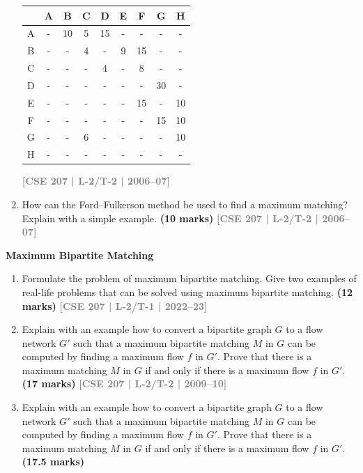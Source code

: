 \documentclass[12pt,a3paper]{article}
\newcommand{\yr}[1]{\hfill\textcolor{gray}{\small\textbf{[#1]}}}
\newcommand{\mk}[1]{\textcolor{orange!70!black}{\small\textbf{(#1 marks)}}}
\newcommand{\subtopic}[2]{%
  \vspace{10pt}
  \noindent\begin{tcolorbox}[colback=#1!8,colframe=#1,boxrule=0.6pt,arc=4pt,
    left=6pt,right=6pt,top=4pt,bottom=4pt]
    \small\bfseries\textcolor{#1}{#2}
  \end{tcolorbox}
  \vspace{2pt}
}
\begin{document}
\begin{enumerate}
\begin{center}
\begin{tabular}{ccccccccc}
\toprule
  & A  & B  & C & D & E  & F  & G  & H \\
\midrule
A & -  & 10 & 5 & 15 & - & -  & -  & - \\
B & -  & -  & 4 & -  & 9 & 15 & -  & - \\
C & -  & -  & - & 4  & - & 8  & -  & - \\
D & -  & -  & - & -  & - & -  & 30 & - \\
E & -  & -  & - & -  & - & 15 & -  & 10 \\
F & -  & -  & - & -  & - & -  & 15 & 10 \\
G & -  & -  & 6 & -  & - & -  & -  & 10 \\
H & -  & -  & - & -  & - & -  & -  & - \\
\bottomrule
\end{tabular}
\end{center}
\yr{CSE 207 | L-2/T-2 | 2006--07}

\item How can the Ford--Fulkerson method be used to find a maximum matching? Explain with a simple example. \mk{10}
\yr{CSE 207 | L-2/T-2 | 2006--07}




\end{enumerate}

\subtopic{cA}{Maximum Bipartite Matching}
\label{sub:s1-bipartite}

\begin{enumerate}

\item Formulate the problem of maximum bipartite matching. Give two examples of real-life problems that can be solved using maximum bipartite matching.
\mk{12} \yr{CSE 207 | L-2/T-1 | 2022--23}


\item Explain with an example how to convert a bipartite graph $G$ to a flow network $G'$ such that a maximum bipartite matching $M$ in $G$ can be computed by finding a maximum flow $f$ in $G'$. Prove that there is a maximum matching $M$ in $G$ if and only if there is a maximum flow $f$ in $G'$. \mk{17}
\yr{CSE 207 | L-2/T-2 | 2009--10}

\item Explain with an example how to convert a bipartite graph $G$ to a flow network
$G'$ such that a maximum bipartite matching $M$ in $G$ can be computed by finding
a maximum flow $f$ in $G'$. Prove that there is a maximum matching $M$ in $G$
if and only if there is a maximum flow $f$ in $G'$. \mk{17.5}



\end{enumerate}
\end{document}
